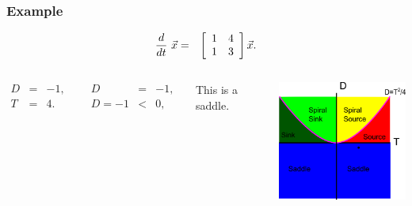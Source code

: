 \begin{frame}
  \frametitle{Example}

  \begin{eqnarray*}
    \deriv{~}{t} \vec{x} & = & \arrayTwo{1}{4}{1}{3} \vec{x}.
  \end{eqnarray*}

  \begin{columns}
     {
      \begin{eqnarray*}
        D & = & -1, \\
        T & = & 4.
      \end{eqnarray*}
    }

     {
      \begin{eqnarray*}
        D & = & -1, \\
        D=-1 & < & 0,
      \end{eqnarray*}
    }

     { This is a saddle.
    
      \centerline{\includegraphics[width=5cm]{img/traceDeterminantExample2}}
    }
  \end{columns}

\end{frame}


